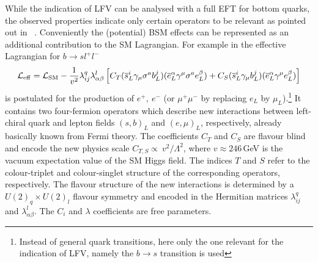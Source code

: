 While the indication of LFV can be analysed with a full EFT for bottom
quarks, the observed properties indicate only certain operators to be
relevant as pointed out in~ \citet{Buttazzo:2017ixm}. Conveniently the
(potential) BSM effects can be represented as an additional
contribution to the SM Lagrangian.  For example in
\citet{Buttazzo:2017ixm} the effective Lagrangian for
$b\rightarrow s l^+l^-$
\begin{equation}\label{eq:leff}
{\cal L}_{\rm eff} = {\cal L}_{\rm SM} - \frac{1}{v^2}\lambda^q_{ij}\lambda^l_{\alpha\beta}\left[C_T(\overline{s}^i_L\gamma_\mu\sigma^a b^j_L)(\overline{e}_L^\alpha\gamma^\mu\sigma^a e_L^\beta)+C_S(\overline{s}_L^i\gamma_\mu b_L^j)(\overline{e}_L^\alpha\gamma^\mu e_L^\beta)\right]
\end{equation}
is postulated for the production of $e^+,~e^-$ (or $\mu^+ \mu^-$ by
replacing $e_L$ by $\mu_L$).\footnote{Instead of general quark
  transitions, here only the one relevant for the indication of LFV,
  namely the $b\rightarrow s$ transition is used} It contains two
four-fermion operators which describe new interactions between
left-chiral quark and lepton fields $(s,b)_L$ and $(e,\mu )_L$,
respectively, already basically known from Fermi theory.  The
coefficients $C_T$ and $C_S$ are flavour blind and encode the new
physics scale $C_{T,S} \propto \ v^2/\Lambda^2$, where $v \approx
246$\,GeV is the vacuum expectation value of the SM Higgs field. The indices $T$ and $S$ refer
to the colour-triplet and colour-singlet structure of the
corresponding operators, respectively.  The flavour structure of the
new interactions is determined by a $U(2)_q\times U(2)_l$ flavour
symmetry and encoded in the Hermitian matrices $\lambda^q_{ij}$ and
$\lambda^l_{\alpha\beta}$. The $C_i$ and $\lambda $ coefficients are
free parameters.

